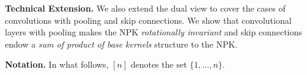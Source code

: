 
\textbf{Technical Extension.} We also extend the dual view to cover the cases of convolutions with pooling and skip connections. We show that convolutional layers with pooling makes the NPK \emph{rotationally invariant} and skip connections endow a \emph{sum of product of base kernels} structure to the NPK.

\textbf{Notation.} In what follows, $[n]$ denotes the set $\{1,\ldots,n\}$.
